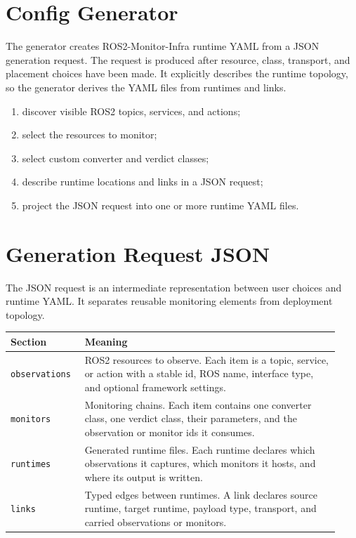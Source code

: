 \documentclass[11pt]{article}
\begin{document}
\section{Config Generator}

The generator creates ROS2-Monitor-Infra runtime YAML from a JSON generation
request. The request is produced after resource, class, transport, and
placement choices have been made. It explicitly describes the runtime
topology, so the generator derives the YAML files from runtimes and links.

\begin{enumerate}
  \item discover visible ROS2 topics, services, and actions;
  \item select the resources to monitor;
  \item select custom converter and verdict classes;
  \item describe runtime locations and links in a JSON request;
  \item project the JSON request into one or more runtime YAML files.
\end{enumerate}

\section{Generation Request JSON}

The JSON request is an intermediate representation between user choices and
runtime YAML. It separates reusable monitoring elements from deployment
topology.

\begin{tabular}{@{}p{0.20\linewidth}p{0.73\linewidth}@{}}
\toprule
Section & Meaning \\
\midrule
\texttt{observations} &
ROS2 resources to observe. Each item is a topic, service, or action with a
stable id, ROS name, interface type, and optional framework settings. \\
\texttt{monitors} &
Monitoring chains. Each item contains one converter class, one verdict class,
their parameters, and the observation or monitor ids it consumes. \\
\texttt{runtimes} &
Generated runtime files. Each runtime declares which observations it captures,
which monitors it hosts, and where its output is written. \\
\texttt{links} &
Typed edges between runtimes. A link declares source runtime, target runtime,
payload type, transport, and carried observations or monitors. \\
\bottomrule
\end{tabular}
\end{document}
